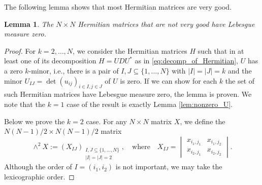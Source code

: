 \documentclass[11pt, a4paper]{article}
\numberwithin{equation}{section}
\newcommand{\ie}{i.e.}
\newtheorem{lem}{Lemma}
\theoremstyle{definition}
\theoremstyle{remark}
\begin{document}
The following lemma shows that most Hermitian matrices are very good.

\begin{lem} \label{lem:very_good_Lebesgue}
  The $N \times N$ Hermitian matrices that are not very good have Lebesgue measure zero.
\end{lem}

\begin{proof}
  For $k = 2, \dotsc, N$, we consider the Hermitian matrices $H$ such that in at least one of its decomposition $H = U D U^*$ as in \eqref{eq:decomp_of_Hermitian}, $U$ has a zero $k$-minor, \ie, there is a pair of $I, J \subseteq \{ 1, \dotsc, N \}$ with $\lvert I \rvert = \lvert J \rvert = k$ and the minor $U_{IJ} = \det(u_{ij})_{i \in I, j \in J}$ of $U$ is zero. If we can show for each $k$ the set of such Hermitian matrices have Lebesgue measure zero, the lemma is proven. We note that the $k = 1$ case of the result is exactly Lemma \ref{lem:nonzero_U}.

  Below we prove the $k = 2$ case. For any $N \times N$ matrix $X$, we define the $N(N - 1)/2 \times N(N - 1)/2$ matrix
  \begin{equation}
    \wedge^2 X := (X_{IJ})_{\substack{I, J \subseteq \{ 1, \dotsc, N \} \\ \lvert I \rvert = \lvert J \rvert = 2}}, \quad \text{where} \quad X_{IJ} =
    \begin{vmatrix}
      x_{i_1, j_1} & x_{i_1, j_2} \\
      x_{i_2, j_1} & x_{i_2, j_2}
    \end{vmatrix}.
  \end{equation}
  Although the order of $I = (i_1, i_2)$ is not important, we may take the lexicographic order.


\end{proof}
\end{document}
